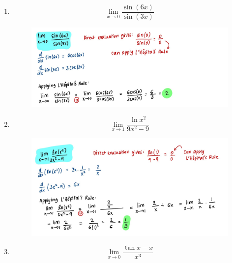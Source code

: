 \documentclass{article}
\begin{document}
\begin{enumerate}
\begin{figure}[H]
        \label{fig:Q3}
    \end{figure}
    \item $$\lim_{x \rightarrow 0}  \frac{\sin(6x)}{\sin(3x)}$$
    \begin{figure}[H]
        \centering
        \includegraphics[width=\linewidth]{Q4.jpg}
        \label{fig:Q4}
    \end{figure}
    \item $$\lim_{x \rightarrow 1} \frac{\ln x^2}{9x^2-9}$$
    \begin{figure}[H]
        \centering
        \includegraphics[width=\linewidth]{Q5.jpg}
        \label{fig:Q5}
    \end{figure}
    \newpage
    \item $$\lim_{x \rightarrow 0}\frac{\tan x - x}{x^3}$$
    \begin{figure}[H]
        \centering

\end{figure}
\end{enumerate}
\end{document}
